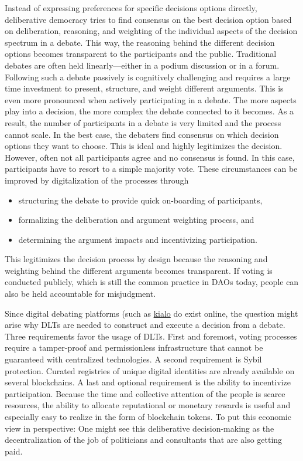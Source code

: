 \documentclass[%
aip,
amsmath,amssymb,
reprint,%
unsortedaddress,
nofootinbib
]{revtex4-2}
\begin{document}
Instead of expressing preferences for specific decisions options directly, 
deliberative democracy tries to find consensus on the best decision option based on deliberation, reasoning, and weighting of the individual aspects of the decision spectrum in a debate.
This way, the reasoning behind the different decision options becomes transparent to the participants and the public.
Traditional debates are often held linearly---either in a podium discussion or in a forum.
Following such a debate passively is cognitively challenging and requires a large time investment
to present, structure, and weight different arguments.
This is even more pronounced when actively participating in a debate.
The more aspects play into a decision, the more complex the debate connected to it becomes.
As a result, the number of participants in a debate is very limited and the process cannot scale.\todo{}
In the best case, the debaters find consensus on which decision options they want to choose.
This is ideal and highly legitimizes the decision.
However, often not all participants agree and no consensus is found.
In this case, participants have to resort to a simple majority vote.
These circumstances can be improved by digitalization of the processes through
\begin{itemize}[noitemsep]
	\item structuring the debate to provide quick on-boarding of participants,
	\item formalizing the deliberation and argument weighting process, and
	\item determining the argument impacts and incentivizing participation. 
\end{itemize}

This legitimizes the decision process by design because the reasoning and weighting behind the different arguments becomes transparent.
If voting is conducted publicly, which is still the common practice in \acp{DAO} today, 
people can also be held accountable for misjudgment.

Since digital debating platforms (such as \href{https://www.kialo.com/}{kialo} do exist online,
the question might arise why \acp{DLT} are needed to construct and execute a decision from a debate.
%
Three requirements favor the usage of \acp{DLT}.
First and foremost, voting processes require a tamper-proof and permissionless infrastructure that cannot be guaranteed with centralized technologies.
A second requirement is Sybil protection. 
Curated registries of unique digital identities are already available on several blockchains. 
A last and optional requirement is the ability to incentivize participation.
Because the time and collective attention of the people is scarce resources,
the ability to allocate reputational or monetary rewards is useful
and especially easy to realize in the form of blockchain tokens.
To put this economic view in perspective:
One might see this deliberative decision-making as the decentralization of the job of politicians and consultants that are also getting paid.
\end{document}
